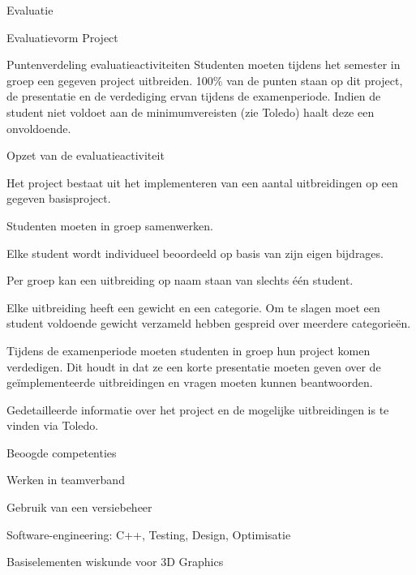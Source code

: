 \documentclass{studiewijzer}
\begin{document}
\begin{categorybox}{Evaluatie}
    \begin{category}{Evaluatievorm}
        Project
    \end{category}

    \begin{category}{Puntenverdeling evaluatieactiviteiten}
        Studenten moeten tijdens het semester in groep een gegeven project uitbreiden.
        100\% van de punten staan op dit project, de presentatie en de verdediging ervan tijdens de examenperiode.
        Indien de student niet voldoet aan de minimumvereisten (zie Toledo) haalt deze een onvoldoende.
    \end{category}

    \begin{category}{Opzet van de evaluatieactiviteit}
        \begin{items}
            \item Het project bestaat uit het implementeren van een aantal uitbreidingen op een gegeven basisproject.
            \item Studenten moeten in groep samenwerken.
            \item Elke student wordt individueel beoordeeld op basis van zijn eigen bijdrages.
            \item Per groep kan een uitbreiding op naam staan van slechts één student.
            \item Elke uitbreiding heeft een gewicht en een categorie. Om te slagen moet een student voldoende gewicht verzameld hebben gespreid over meerdere categorieën.
            \item Tijdens de examenperiode moeten studenten in groep hun project komen verdedigen. Dit houdt in dat ze een korte presentatie moeten geven over de geïmplementeerde uitbreidingen en vragen moeten kunnen beantwoorden.
            \item Gedetailleerde informatie over het project en de mogelijke uitbreidingen is te vinden via Toledo.
        \end{items}
    \end{category}

    \begin{category}{Beoogde competenties}
        \begin{items}
            \item Werken in teamverband
            \item Gebruik van een versiebeheer
            \item Software-engineering: C++, Testing, Design, Optimisatie
            \item Basiselementen wiskunde voor 3D Graphics
        \end{items}
    \end{category}


\end{categorybox}
\end{document}
